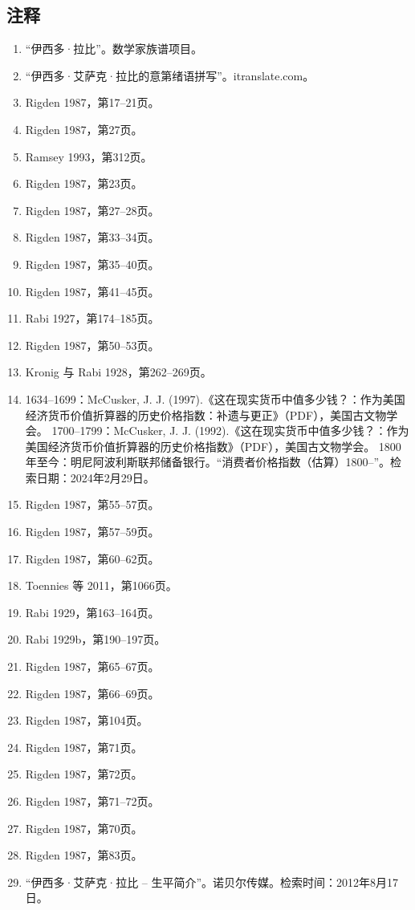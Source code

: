 \subsection{注释}
\begin{enumerate}
\item “伊西多·拉比”。数学家族谱项目。
\item “伊西多·艾萨克·拉比的意第绪语拼写”。itranslate.com。
\item Rigden 1987，第17–21页。
\item Rigden 1987，第27页。
\item Ramsey 1993，第312页。
\item Rigden 1987，第23页。
\item Rigden 1987，第27–28页。
\item Rigden 1987，第33–34页。
\item Rigden 1987，第35–40页。
\item Rigden 1987，第41–45页。
\item Rabi 1927，第174–185页。
\item Rigden 1987，第50–53页。
\item Kronig 与 Rabi 1928，第262–269页。
\item 1634–1699：McCusker, J. J. (1997).《这在现实货币中值多少钱？：作为美国经济货币价值折算器的历史价格指数：补遗与更正》（PDF），美国古文物学会。
1700–1799：McCusker, J. J. (1992).《这在现实货币中值多少钱？：作为美国经济货币价值折算器的历史价格指数》（PDF），美国古文物学会。
1800年至今：明尼阿波利斯联邦储备银行。“消费者价格指数（估算）1800–”。检索日期：2024年2月29日。
\item Rigden 1987，第55–57页。
\item Rigden 1987，第57–59页。
\item Rigden 1987，第60–62页。
\item Toennies 等 2011，第1066页。
\item Rabi 1929，第163–164页。
\item Rabi 1929b，第190–197页。
\item Rigden 1987，第65–67页。
\item Rigden 1987，第66–69页。
\item Rigden 1987，第104页。
\item Rigden 1987，第71页。
\item Rigden 1987，第72页。
\item Rigden 1987，第71–72页。
\item Rigden 1987，第70页。
\item Rigden 1987，第83页。
\item “伊西多·艾萨克·拉比 – 生平简介”。诺贝尔传媒。检索时间：2012年8月17日。

\end{enumerate}
